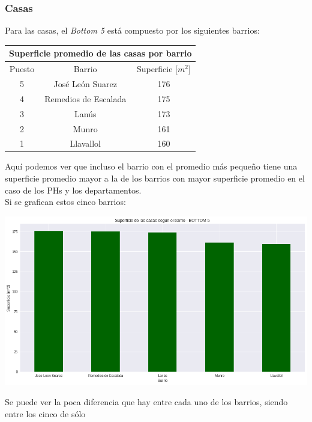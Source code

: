 \documentclass[a4paper, 10pt]{article}
\newcommand\tab[1][0.5cm]{\hspace*{#1}}
\begin{document}
        \subsubsection{Casas}
          Para las casas, el \emph{Bottom 5} está compuesto por los siguientes barrios:
          \begin{center}
            \begin{tabular}{ |c|c|c| }
              \hline
              \multicolumn{3}{|c|}{Superficie promedio de las casas por barrio}\\
              \hline
              \hline
              Puesto & Barrio & Superficie [$m^2$]\\
              \hline
              5 & José León Suarez & 176\\
              4 & Remedios de Escalada & 175\\
              3 & Lanús & 173\\
              2 & Munro & 161 \\
              1 & Llavallol & 160\\
              \hline
            \end{tabular}
          \end{center}
          \tab Aquí podemos ver que incluso el barrio con el promedio más pequeño tiene una superficie promedio mayor
          a la de los barrios con mayor superficie promedio en el caso de los PHs y los departamentos. \\
          \tab Si se grafican estos cinco barrios:
          \begin{center}
                  \includegraphics[width=\textwidth]{images/houseSurfaceBottomBar}
            \end{center}
            \tab Se puede ver la poca diferencia que hay entre cada uno de los barrios, siendo entre los cinco de sólo
\end{document}
